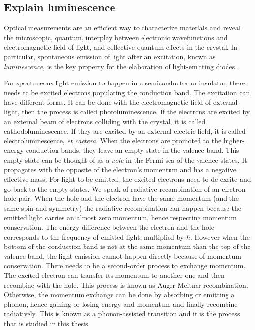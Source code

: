 \subsection{Explain luminescence}
Optical measurements are an efficient way to characterize materials and reveal the microscopic, quantum, interplay between electronic wavefunctions and electromagnetic field of light, and collective quantum effects in the crystal.\cite{something} In particular, spontaneous emission of light after an excitation, known as \textit{luminescence}, is the key property for the elaboration of light-emitting diodes. 

For spontaneous light emission to happen in a semiconductor or insulator, there needs to be excited electrons populating the conduction band. The excitation can have different forms. It can be done with the electromagnetic field of external light, then the process is called photoluminescence. If the electrons are excited by an external beam of electrons colliding with the crystal, it is called cathodoluminescence. If they are excited by an external electric field, it is called electroluminescence, \textit{et caetera}. When the electrons are promoted to the higher-energy conduction bands, they leave an empty state in the valence band. This empty state can be thought of as a \textit{hole} in the Fermi sea of the valence states. It propagates with the opposite of the electron's momentum and has a negative effective mass. For light to be emitted, the excited electrons need to de-excite and go back to the empty states. We speak of radiative recombination of an electron-hole pair. When the hole and the electron have the same momentum (and the same spin and symmetry) the radiative recombination can happen because the emitted light carries an almost zero momentum, hence respecting momentum conservation. The energy difference between the electron and the hole corresponds to the frequency of emitted light, multiplied by $\hbar$. 
However when the bottom of the conduction band is not at the same momentum than the top of the valence band, the light emission cannot happen directly because of momentum conservation. There needs to be a second-order process to exchange momentum. The excited electron can transfer its momentum to another one and then recombine with the hole. This process is known as Auger-Meitner recombination.\cite{somethingKioupakis} Otherwise, the momentum exchange can be done by absorbing or emitting a phonon, hence gaining or losing energy and momentum and finally recombine radiatively. This is known as a phonon-assisted transition and it is the process that is studied in this thesis. 

